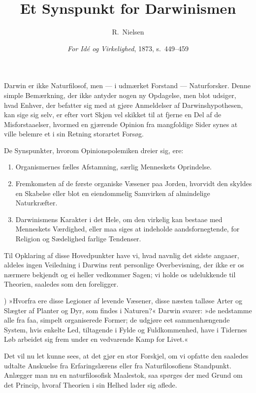 \documentclass[12pt,a4paper]{article}
\title{\textbf{Et Synspunkt for Darwinismen}}
\author{R.\ Nielsen}
\date{\emph{For Idé og Virkelighed}, 1873, s.\ 449--459}
\begin{document}
\maketitle
\thispagestyle{fancy}

\bigskip

\noindent Darwin er ikke Naturfilosof, men --- i udmærket Forstand ---
Naturforsker. Denne simple Bemærkning, der ikke antyder nogen ny
Opdagelse, men blot udsiger, hvad Enhver, der befatter sig med at
gjøre Anmeldelser af Darwinshypothesen, kan sige sig selv, er efter
vort Skjøn vel skikket til at fjerne en Del af de Misforstaaelser,
hvormed en gjærende Opinion fra mangfoldige Sider synes at ville
belemre et i sin Retning storartet Forsøg.

De Synspunkter, hvorom Opinionspolemiken dreier sig, ere:

\begin{enumerate}
  \item Organismernes fælles Afstamning, særlig Menneskets Oprindelse.
  \item Fremkomsten af de første organiske Væsener paa Jorden,
        hvorvidt den skyldes en Skabelse eller blot en eiendommelig
        Samvirken af almindelige Naturkræfter.
  \item Darwinismens Karakter i det Hele, om den virkelig kan bestaae
        med Menneskets Værdighed, eller maa siges at indeholde
        aandsfornegtende, for Religion og Sædelighed farlige Tendenser.
\end{enumerate}

\noindent Til Opklaring af disse Hovedpunkter have vi, hvad navnlig
det sidste angaaer, aldeles ingen Veiledning i Darwins rent personlige
Overbevisning, der ikke er os nærmere bekjendt og ei heller vedkommer
Sagen; vi holde os udelukkende til Theorien, saaledes som den
foreligger.


\medskip

) »Hvorfra ere disse Legioner af levende Væsener, disse næsten
talløse Arter og Slægter af Planter og Dyr, som findes i Naturen?«
Darwin svarer: »de nedstamme alle fra faa, simpelt organiserede Former;
de udgjøre eet sammenhængende System, hvis enkelte Led, tiltagende i
Fylde og Fuldkommenhed, have i Tidernes Løb arbeidet sig frem under en
vedvarende Kamp for Livet.«

Det vil nu let kunne sees, at det gjør en stor Forskjel, om vi opfatte
den saaledes udtalte Anskuelse fra Erfaringslærens eller fra
Naturfilosofiens Standpunkt. Anlægger man nu en naturfilosofisk
Maalestok, saa spørges der med Grund om det Princip, hvoraf Theorien i
sin Helhed lader sig aflede.
\end{document}
